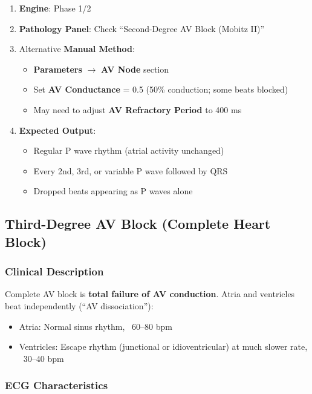 \documentclass[12pt,a4paper,oneside]{book}
\begin{document}
\begin{enumerate}
    \item \textbf{Engine}: Phase 1/2
    \item \textbf{Pathology Panel}: Check ``Second-Degree AV Block (Mobitz II)''
    \item Alternative \textbf{Manual Method}:
    \begin{itemize}
        \item \textbf{Parameters} $\to$ \textbf{AV Node} section
        \item Set \textbf{AV Conductance} = 0.5 (50\% conduction; some beats blocked)
        \item May need to adjust \textbf{AV Refractory Period} to 400 ms
    \end{itemize}
    \item \textbf{Expected Output}:
    \begin{itemize}
        \item Regular P wave rhythm (atrial activity unchanged)
        \item Every 2nd, 3rd, or variable P wave followed by QRS
        \item Dropped beats appearing as P waves alone
    \end{itemize}
\end{enumerate}

\subsection{Third-Degree AV Block (Complete Heart Block)}

\subsubsection{Clinical Description}

Complete AV block is \textbf{total failure of AV conduction}. Atria and ventricles beat independently (``AV dissociation''):

\begin{itemize}
    \item Atria: Normal sinus rhythm, ~60–80 bpm
    \item Ventricles: Escape rhythm (junctional or idioventricular) at much slower rate, ~30–40 bpm
\end{itemize}

\subsubsection{ECG Characteristics}
\end{document}
